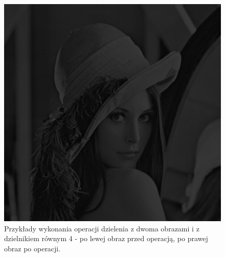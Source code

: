 \documentclass{article}
\begin{document}
\begin{figure}[!htb]
\includegraphics[scale=0.2]{img/_Dzielenie_Obrazka_lena_8bit.png} 
\caption{Przykłady wykonania operacji dzielenia z dwoma obrazami i z dzielnikiem równym 4 - po lewej obraz przed operacją, po prawej obraz po operacji. }
\end{figure}

\FloatBarrier
\end{document}
